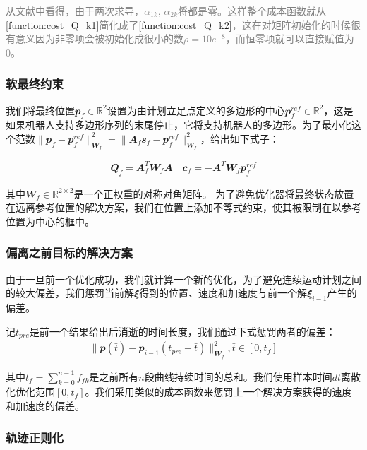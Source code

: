 \textcolor{gray}{
    从文献\cite[p]{Goldfarb_Idnani_1983}中看得，由于两次求导，$\alpha_{1k}, \, \alpha_{2k}$将都是零。这样整个成本函数就从\ref{function:cost_Q_k1}简化成了\ref{function:cost_Q_k2}，这在对矩阵初始化的时候很有意义因为非零项会被初始化成很小的数$\rho=10e^{-8}$，而恒零项就可以直接赋值为0。
}
\subsubsection{软最终约束\label{subsection:soft_final_constrants}}

我们将最终位置$\mathbfit{p}_f\in\mathbb{R}^2$设置为由计划立足点定义的多边形的中心$\mathbfit{p}_f^{ref}\in\mathbb{R}^2$，这是如果机器人支持多边形序列的末尾停止，它将支持机器人的多边形。为了最小化这个范数$\|\mathbfit{p}_f-\mathbfit{p}_f^{ref}\|^2_{\mathbfit{W}_f}=\|\mathbfit{A}_f\mathbfit{s}_f-\mathbfit{p}_f^{ref}\|^2_{\mathbfit{W}_f}$，给出如下式子：

\begin{align}
    \mathbfit{Q}_f=\mathbfit{A}_f^T \mathbfit{W}_f \mathbfit{A} \quad \mathbfit{c}_f=-\mathbfit{A}^T \mathbfit{W}_f \mathbfit{p}_f^{ref}
\end{align}

其中$\mathbfit{W}_f \in \mathbb{R}^{2\times2}$是一个正权重的对称对角矩阵。
为了避免优化器将最终状态放置在远离参考位置的解决方案，我们在位置上添加不等式约束，使其被限制在以参考位置为中心的框中。

\subsubsection{偏离之前目标的解决方案\label{subsection:deviation_previous}}
由于一旦前一个优化成功，我们就计算一个新的优化，为了避免连续运动计划之间的较大偏差，我们惩罚当前解$\mathbfit{\xi}$得到的位置、速度和加速度与前一个解$\mathbfit{\xi}_{i-1}$产生的偏差。

记$t_{pre}$是前一个结果给出后消逝的时间长度，我们通过下式惩罚两者的偏差：
\begin{align}
    \|\mathbfit{p}(\bar t)-\mathbfit{p}_{i-1}(t_{pre}+\bar t)\|^2_{\mathbfit{W}_f}, \bar t \in[0, t_f]
\end{align}

其中$t_f=\sum_{k=0}^{n-1}f_{fk}$是之前所有$n$段曲线持续时间的总和。我们使用样本时间$dt$离散化优化范围$[0, t_f]$。我们采用类似的成本函数来惩罚上一个解决方案获得的速度和加速度的偏差。

\subsubsection{轨迹正则化}

